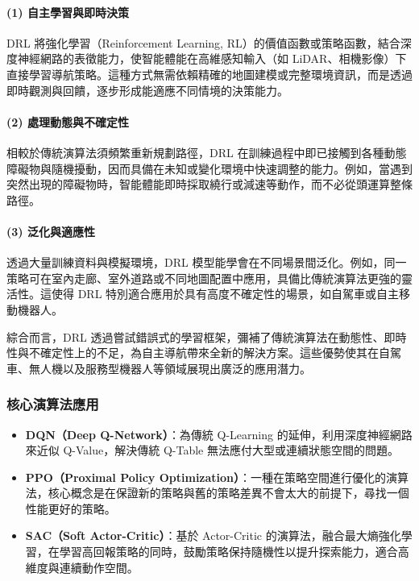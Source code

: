 \documentclass[12pt,a4paper]{article}
\begin{document}
\paragraph{(1) 自主學習與即時決策}
DRL 將強化學習（Reinforcement Learning, RL）的價值函數或策略函數，結合深度神經網路的表徵能力，使智能體能在高維感知輸入（如 LiDAR、相機影像）下直接學習導航策略。這種方式無需依賴精確的地圖建模或完整環境資訊，而是透過即時觀測與回饋，逐步形成能適應不同情境的決策能力。

\paragraph{(2) 處理動態與不確定性}
相較於傳統演算法須頻繁重新規劃路徑，DRL 在訓練過程中即已接觸到各種動態障礙物與隨機擾動，因而具備在未知或變化環境中快速調整的能力。例如，當遇到突然出現的障礙物時，智能體能即時採取繞行或減速等動作，而不必從頭運算整條路徑。

\paragraph{(3) 泛化與適應性}
透過大量訓練資料與模擬環境，DRL 模型能學會在不同場景間泛化。例如，同一策略可在室內走廊、室外道路或不同地圖配置中應用，具備比傳統演算法更強的靈活性。這使得 DRL 特別適合應用於具有高度不確定性的場景，如自駕車或自主移動機器人。

\noindent 綜合而言，DRL 透過嘗試錯誤式的學習框架，彌補了傳統演算法在動態性、即時性與不確定性上的不足，為自主導航帶來全新的解決方案。這些優勢使其在自駕車、無人機以及服務型機器人等領域展現出廣泛的應用潛力。

\subsubsection{核心演算法應用}
\begin{itemize}
  \item \textbf{DQN（Deep Q-Network）}：為傳統 Q-Learning 的延伸，利用深度神經網路來近似 Q-Value，解決傳統 Q-Table 無法應付大型或連續狀態空間的問題。
  \item \textbf{PPO（Proximal Policy Optimization）}：一種在策略空間進行優化的演算法，核心概念是在保證新的策略與舊的策略差異不會太大的前提下，尋找一個性能更好的策略。
  \item \textbf{SAC（Soft Actor-Critic）}：基於 Actor-Critic 的演算法，融合最大熵強化學習，在學習高回報策略的同時，鼓勵策略保持隨機性以提升探索能力，適合高維度與連續動作空間。
\end{itemize}
\end{document}
